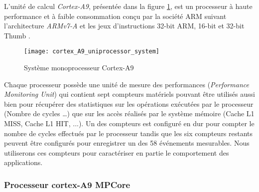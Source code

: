             L'unité de calcul \emph{Cortex-A9}, présentée dans la figure \ref{fig:cortex_A9_uniprocessor_system}, est un processeur à haute performance et à faible consommation conçu par la société ARM suivant l'architecture \emph{ARMv7-A} \cite{manuel:ARMv7} et les jeux d'instructions 32-bit ARM, 16-bit et 32-bit Thumb \cite{manuel:cortex_A9_technical_reference_manual}.

            \begin{figure}[!ht]
                \centering
                \texttt{[image: cortex\_A9\_uniprocessor\_system]}
                \caption{Système monoprocesseur Cortex-A9 \cite{manuel:cortex_A9_technical_reference_manual}}
                \label{fig:cortex_A9_uniprocessor_system}
            \end{figure}

            Chaque processeur possède une unité de mesure des performances (\emph{Performance Monitoring Unit}) qui contient sept compteurs matériels pouvant être utilisés aussi bien pour récupérer des statistiques sur les opérations exécutées par le processeur (Nombre de cycles …) que sur les accès réalisés par le système mémoire (Cache L1 MISS, Cache L1 HIT, ...). Un des compteurs est configuré en dur pour compter le nombre de cycles effectués par le processeur tandis que les six compteurs restants peuvent être configurés pour enregistrer un des 58 événements mesurables.
            Nous utiliserons ces compteurs pour caractériser en partie le comportement des applications.



        \subsubsection{Processeur cortex-A9 MPCore}


